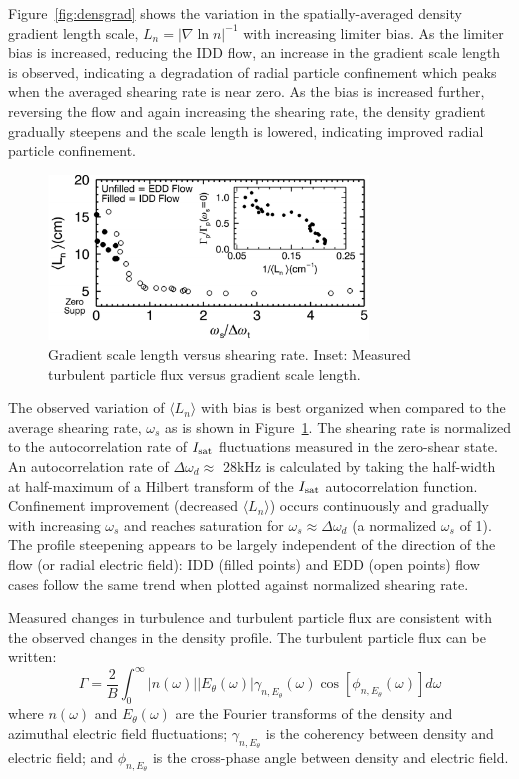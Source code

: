 \documentclass[aps,prl,amsmath,amssymb,preprint,superscriptaddress]{revtex4}
\begin{document}
Figure~\ref{fig:densgrad} shows the variation in the spatially-averaged density gradient length scale, $L_{n} = \lvert \nabla \ln n \rvert ^{-1}$ with
increasing limiter bias.  As the limiter bias is increased, reducing
the IDD flow, an increase in the gradient scale length is observed,
indicating a degradation of radial particle confinement which peaks
when the averaged shearing rate is near zero. As the bias is
increased further, reversing the flow and again increasing the
shearing rate, the density gradient gradually steepens and the
scale length is lowered, indicating improved radial particle confinement.  

\begin{figure}[!htbp]
\centerline{
\includegraphics[width=8.5cm]{shearandgrad.pdf}}
\caption{\label{fig:shearandgrad} Gradient scale length versus
  shearing rate. Inset: Measured turbulent particle flux versus
  gradient scale length.}
\end{figure}

The observed variation of $\langle L_{n} \rangle$ with bias is best
organized when compared to the average shearing rate, $\omega_s$ as is
shown in Figure~\ref{fig:shearandgrad}.   The shearing rate is
normalized to the autocorrelation rate of $I_{\rm sat}$ fluctuations
measured in the zero-shear state.  An autocorrelation rate of $\Delta
\omega_{d} \approx $ 28kHz is calculated by taking the half-width at
half-maximum of a Hilbert transform of the $I_{\rm sat}$
autocorrelation function.  Confinement improvement (decreased $\langle
L_n \rangle$) occurs continuously and gradually with increasing
$\omega_{s}$ and reaches saturation for $\omega_{s} \approx \Delta
\omega_{d}$ (a normalized $\omega_s$ of 1).  The profile steepening
appears to be largely independent of the direction of the flow (or radial electric field): IDD (filled points) and EDD (open points) flow cases follow the same trend when plotted against normalized shearing rate.

Measured changes in turbulence and turbulent particle flux are
consistent with the observed changes in the density profile.  The
turbulent particle flux can be written\cite{powers74}:
\begin{equation}
\Gamma = \frac{2}{B} \int^{\infty}_{0} \lvert n(\omega) \rvert \lvert E_{\theta}(\omega) \rvert \gamma_{n,E_{\theta}}(\omega) \cos [\phi_{n,E_{\theta}}(\omega)] d\omega
\label{eq:fluxint}
\end{equation}
where $n(\omega)$ and $E_\theta(\omega)$ are the Fourier transforms of
the density and azimuthal electric field fluctuations;
$\gamma_{n,E_\theta}$ is the coherency between density and electric
field; and $\phi_{n,E_\theta}$ is the cross-phase angle between
density and electric field.
\end{document}
